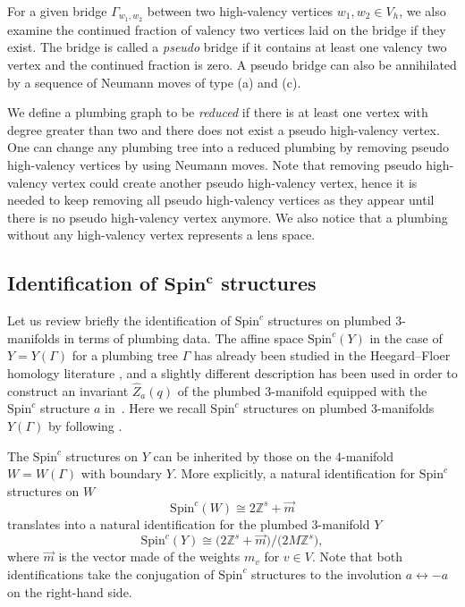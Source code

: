 \documentclass[pdftex]{sigma}
\numberwithin{equation}{section}
\begin{document}
For a given bridge $ \Gamma_{w_1,w_2} $ between two high-valency vertices $ w_1,w_2\in V_h $, we also examine the continued fraction of valency two vertices laid on the bridge if they exist. The bridge is called a \textit{pseudo} bridge if it contains at least one valency two vertex and the continued fraction is zero. A pseudo bridge can also be annihilated by a sequence of Neumann moves of type (a) and (c).

We define a plumbing graph to be \textit{reduced} if there is at least one vertex with degree greater than two and there does not exist a pseudo high-valency vertex. One can change any plumbing tree into a reduced plumbing by removing pseudo high-valency vertices by using Neumann moves. Note that removing pseudo high-valency vertex could create another pseudo high-valency vertex, hence it is needed to keep removing all pseudo high-valency vertices as they appear until there is no pseudo high-valency vertex anymore. We also notice that a plumbing without any high-valency vertex represents a lens space.

\subsection[Identification of Spin\^{}c structures]{Identification of $\boldsymbol{\text{Spin}^c}$ structures}

Let us review briefly the identification of $ \text{Spin}^c $ structures on plumbed 3-manifolds in terms of plumbing data. The affine space $ \text{Spin}^c(Y) $ in the case of $ Y=Y(\Gamma) $ for a plumbing tree $ \Gamma $ has already been studied in the Heegard--Floer homology literature \cite{heegard-floer}, and a slightly different description has been used in order to construct an invariant $ \hat{Z}_a(q) $ of the plumbed 3-manifold equipped with the $\text{Spin}^c$ structure $ a $ in~\cite{gukov}. Here we recall $ \text{Spin}^c $ structures on plumbed 3-mani\-folds $ Y(\Gamma) $ by following \cite{gukov}.

The $ \text{Spin}^c $ structures on $ Y $ can be inherited by those on the 4-manifold $ W=W(\Gamma) $ with boundary $ Y $. More explicitly, a natural identification for $ \text{Spin}^c $ structures on $ W $
\begin{equation*}
	\text{Spin}^c(W)\cong 2\mathbb{Z}^s+\vec{m}
\end{equation*}
translates into a natural identification for the plumbed 3-manifold $ Y $
\begin{equation*}
	\text{Spin}^c(Y)\cong \big(2\mathbb{Z}^s+\vec{m}\big)/\big(2M\mathbb{Z}^s\big),
\end{equation*}
where $ \vec{m} $ is the vector made of the weights $ m_v $ for $ v\in V $. Note that both identifications take the conjugation of $ \text{Spin}^c $ structures to the involution $ a\leftrightarrow -a $ on the right-hand side.
\end{document}
